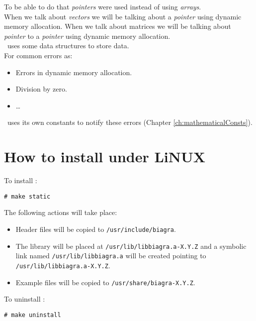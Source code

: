 To be able to do that \emph{pointers} were used instead of using \emph{arrays}.\\

When we talk about \emph{vectors} we will be talking about a \emph{pointer} using dynamic memory allocation. When we talk about matrices we will be talking about \emph{pointer} to a \emph{pointer} using dynamic memory allocation.\\

\BI\ uses some data structures to store data.\\

For common errors as:

\begin{itemize}
\item Errors in dynamic memory allocation.
\item Division by zero.
\item \ldots
\end{itemize}

\BI\ uses its own constants to notify these errors (Chapter \ref{ch:mathematicalConsts}).\\

\section{How to install \BI under LiNUX}

To install \BI:
%
\begin{verbatim}
# make static
\end{verbatim}
%
The following actions will take place:
%
\begin{itemize}
\item Header files will be copied to \texttt{/usr/include/biagra}.
\item The library will be placed at \texttt{/usr/lib/libbiagra.a-X.Y.Z} and a symbolic link named \texttt{/usr/lib/libbiagra.a} will be created pointing to \texttt{/usr/lib/libbiagra.a-X.Y.Z}.
\item Example files will be copied to \texttt{/usr/share/biagra-X.Y.Z}.
\end{itemize}
%
To uninstall \BI:
%
\begin{verbatim}
# make uninstall  
\end{verbatim}
